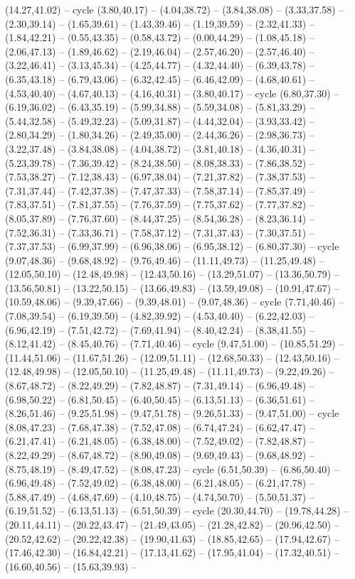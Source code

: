 {(14.27,41.02) -- cycle (3.80,40.17) -- (4.04,38.72) -- (3.84,38.08) -- (3.33,37.58) -- (2.30,39.14) -- (1.65,39.61) -- (1.43,39.46) -- (1.19,39.59) -- (2.32,41.33) -- (1.84,42.21) -- (0.55,43.35) -- (0.58,43.72) -- (0.00,44.29) -- (1.08,45.18) -- (2.06,47.13) -- (1.89,46.62) -- (2.19,46.04) -- (2.57,46.20) -- (2.57,46.40) -- (3.22,46.41) -- (3.13,45.34) -- (4.25,44.77) -- (4.32,44.40) -- (6.39,43.78) -- (6.35,43.18) -- (6.79,43.06) -- (6.32,42.45) -- (6.46,42.09) -- (4.68,40.61) -- (4.53,40.40) -- (4.67,40.13) -- (4.16,40.31) -- (3.80,40.17) -- cycle (6.80,37.30) -- (6.19,36.02) -- (6.43,35.19) -- (5.99,34.88) -- (5.59,34.08) -- (5.81,33.29) -- (5.44,32.58) -- (5.49,32.23) -- (5.09,31.87) -- (4.44,32.04) -- (3.93,33.42) -- (2.80,34.29) -- (1.80,34.26) -- (2.49,35.00) -- (2.44,36.26) -- (2.98,36.73) -- (3.22,37.48) -- (3.84,38.08) -- (4.04,38.72) -- (3.81,40.18) -- (4.36,40.31) -- (5.23,39.78) -- (7.36,39.42) -- (8.24,38.50) -- (8.08,38.33) -- (7.86,38.52) -- (7.53,38.27) -- (7.12,38.43) -- (6.97,38.04) -- (7.21,37.82) -- (7.38,37.53) -- (7.31,37.44) -- (7.42,37.38) -- (7.47,37.33) -- (7.58,37.14) -- (7.85,37.49) -- (7.83,37.51) -- (7.81,37.55) -- (7.76,37.59) -- (7.75,37.62) -- (7.77,37.82) -- (8.05,37.89) -- (7.76,37.60) -- (8.44,37.25) -- (8.54,36.28) -- (8.23,36.14) -- (7.52,36.31) -- (7.33,36.71) -- (7.58,37.12) -- (7.31,37.43) -- (7.30,37.51) -- (7.37,37.53) -- (6.99,37.99) -- (6.96,38.06) -- (6.95,38.12) -- (6.80,37.30) -- cycle (9.07,48.36) -- (9.68,48.92) -- (9.76,49.46) -- (11.11,49.73) -- (11.25,49.48) -- (12.05,50.10) -- (12.48,49.98) -- (12.43,50.16) -- (13.29,51.07) -- (13.36,50.79) -- (13.56,50.81) -- (13.22,50.15) -- (13.66,49.83) -- (13.59,49.08) -- (10.91,47.67) -- (10.59,48.06) -- (9.39,47.66) -- (9.39,48.01) -- (9.07,48.36) -- cycle (7.71,40.46) -- (7.08,39.54) -- (6.19,39.50) -- (4.82,39.92) -- (4.53,40.40) -- (6.22,42.03) -- (6.96,42.19) -- (7.51,42.72) -- (7.69,41.94) -- (8.40,42.24) -- (8.38,41.55) -- (8.12,41.42) -- (8.45,40.76) -- (7.71,40.46) -- cycle (9.47,51.00) -- (10.85,51.29) -- (11.44,51.06) -- (11.67,51.26) -- (12.09,51.11) -- (12.68,50.33) -- (12.43,50.16) -- (12.48,49.98) -- (12.05,50.10) -- (11.25,49.48) -- (11.11,49.73) -- (9.22,49.26) -- (8.67,48.72) -- (8.22,49.29) -- (7.82,48.87) -- (7.31,49.14) -- (6.96,49.48) -- (6.98,50.22) -- (6.81,50.45) -- (6.40,50.45) -- (6.13,51.13) -- (6.36,51.61) -- (8.26,51.46) -- (9.25,51.98) -- (9.47,51.78) -- (9.26,51.33) -- (9.47,51.00) -- cycle (8.08,47.23) -- (7.68,47.38) -- (7.52,47.08) -- (6.74,47.24) -- (6.62,47.47) -- (6.21,47.41) -- (6.21,48.05) -- (6.38,48.00) -- (7.52,49.02) -- (7.82,48.87) -- (8.22,49.29) -- (8.67,48.72) -- (8.90,49.08) -- (9.69,49.43) -- (9.68,48.92) -- (8.75,48.19) -- (8.49,47.52) -- (8.08,47.23) -- cycle (6.51,50.39) -- (6.86,50.40) -- (6.96,49.48) -- (7.52,49.02) -- (6.38,48.00) -- (6.21,48.05) -- (6.21,47.78) -- (5.88,47.49) -- (4.68,47.69) -- (4.10,48.75) -- (4.74,50.70) -- (5.50,51.37) -- (6.19,51.52) -- (6.13,51.13) -- (6.51,50.39) -- cycle (20.30,44.70) -- (19.78,44.28) -- (20.11,44.11) -- (20.22,43.47) -- (21.49,43.05) -- (21.28,42.82) -- (20.96,42.50) -- (20.52,42.62) -- (20.22,42.38) -- (19.90,41.63) -- (18.85,42.65) -- (17.94,42.67) -- (17.46,42.30) -- (16.84,42.21) -- (17.13,41.62) -- (17.95,41.04) -- (17.32,40.51) -- (16.60,40.56) -- (15.63,39.93) -- }
